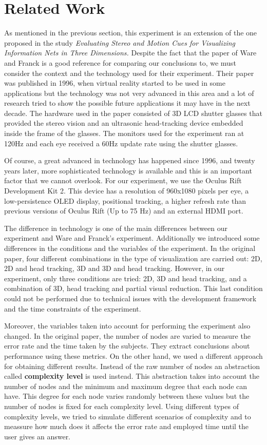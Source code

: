 \chapter{Related Work}

As mentioned in the previous section, this experiment is an
extension of the one proposed in the study \emph{Evaluating Stereo and
Motion Cues for Visualizing Information Nets in Three Dimensions.}
Despite the fact that the paper of Ware and Franck is a good reference for comparing
our conclusions to, we must consider the context and the
technology used for their experiment. Their paper was published in
1996, when virtual reality started to be used in some applications but
the technology was not very advanced in this area and a lot of research
tried to show the possible future applications it may have in the next
decade. The hardware used in the paper consisted of 3D LCD shutter
glasses that provided the stereo vision and an ultrasonic head-tracking
device embedded inside the frame of the glasses. The monitors used for
the experiment ran at 120Hz and each eye received a 60Hz update rate
using the shutter glasses.

Of course, a great advanced in technology has happened since 1996, and
twenty years later, more sophisticated technology is available and this is
an important factor that we cannot overlook. For our experiment, we use the 
Oculus Rift Development Kit 2. This device has a resolution of 960x1080 pixels
per eye, a low-persistence OLED display, positional tracking, a higher
refresh rate than previous versions of Oculus Rift (Up to 75 Hz) and an
external HDMI port.

The difference in technology is one of the main differences between our
experiment and Ware and Franck's experiment. Additionally we introduced some
differences in the conditions and the variables of the experiment. In
the original paper, four different combinations in the type of
visualization are carried out: 2D, 2D and head tracking, 3D and 3D and
head tracking. However, in our experiment, only three conditions are
tried: 2D, 3D and head tracking, and a combination of 3D, head tracking
and partial visual reduction. This last condition could not be performed
due to technical issues with the development framework and the time
constraints of the experiment.

Moreover, the variables taken into account for performing the experiment
also changed. In the original paper, the number of nodes are varied to
measure the error rate and the time taken by the subjects. They
extract conclusions about performance using these metrics. On the other
hand, we used a different approach for obtaining different results.
Instead of the raw number of nodes an abstraction called
\textbf{complexity level} is used instead. This abstraction takes into account
the number of nodes and the minimum and maximum
degree that each node can have. This degree for each node varies randomly between these values
but the number of nodes is fixed for each complexity level. Using
different types of complexity levels, we tried to simulate different
scenarios of complexity and to meassure how much does it affects the error rate
and employed time until the user gives an answer.

